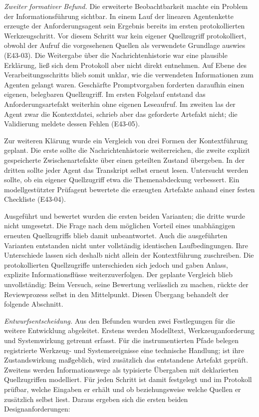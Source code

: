 \emph{Zweiter formativer Befund.} Die erweiterte Beobachtbarkeit
machte ein Problem der Informationsführung sichtbar. In einem Lauf
der linearen Agentenkette erzeugte der Anforderungsagent sein
Ergebnis bereits im ersten protokollierten Werkzeugschritt. Vor
diesem Schritt war kein eigener Quellzugriff protokolliert, obwohl
der Aufruf die vorgesehenen Quellen als verwendete Grundlage
auswies (E43-03). Die Weitergabe über die Nachrichtenhistorie war
eine plausible Erklärung, ließ sich dem Protokoll aber nicht direkt
entnehmen. Auf Ebene des Verarbeitungsschritts blieb somit unklar,
wie die verwendeten Informationen zum Agenten gelangt waren.
Geschärfte Promptvorgaben forderten daraufhin einen eigenen,
belegbaren Quellzugriff. Im ersten Folgelauf entstand das
Anforderungsartefakt weiterhin ohne eigenen Leseaufruf. Im zweiten
las der Agent zwar die Kontextdatei, schrieb aber das geforderte
Artefakt nicht; die Validierung meldete dessen Fehlen (E43-05).

Zur weiteren Klärung wurde ein Vergleich von drei Formen der
Kontextführung geplant. Die erste sollte die Nachrichtenhistorie
weiterreichen, die zweite explizit gespeicherte Zwischenartefakte
über einen geteilten Zustand übergeben. In der dritten sollte jeder
Agent das Transkript selbst erneut lesen. Untersucht werden sollte,
ob ein eigener Quellzugriff etwa die Themenabdeckung verbessert.
Ein modellgestützter Prüfagent bewertete die erzeugten Artefakte
anhand einer festen Checkliste (E43-04).

Ausgeführt und bewertet wurden die ersten beiden Varianten; die
dritte wurde nicht umgesetzt. Die Frage nach dem möglichen Vorteil
eines unabhängigen erneuten Quellzugriffs blieb damit unbeantwortet.
Auch die ausgeführten Varianten entstanden nicht unter vollständig
identischen Laufbedingungen. Ihre Unterschiede lassen sich deshalb
nicht allein der Kontextführung zuschreiben. Die protokollierten
Quellzugriffe unterschieden sich jedoch und gaben Anlass, explizite
Informationsflüsse weiterzuverfolgen. Der geplante Vergleich blieb
unvollständig: Beim Versuch, seine Bewertung verlässlich zu machen,
rückte der Reviewprozess selbst in den Mittelpunkt. Diesen Übergang
behandelt der folgende Abschnitt.

\emph{Entwurfsentscheidung.} Aus den Befunden wurden zwei
Festlegungen für die weitere Entwicklung abgeleitet. Erstens werden
Modelltext, Werkzeuganforderung und Systemwirkung getrennt erfasst.
Für die instrumentierten Pfade belegen registrierte Werkzeug- und
Systemereignisse eine technische Handlung; ist ihre Zustandswirkung
maßgeblich, wird zusätzlich das entstandene Artefakt geprüft.
Zweitens werden Informationswege als typisierte Übergaben mit
deklarierten Quellzugriffen modelliert. Für jeden Schritt ist damit
festgelegt und im Protokoll prüfbar, welche Eingaben er erhält und
ob beziehungsweise welche Quellen er zusätzlich selbst liest. Daraus ergeben sich die
ersten beiden Designanforderungen:

